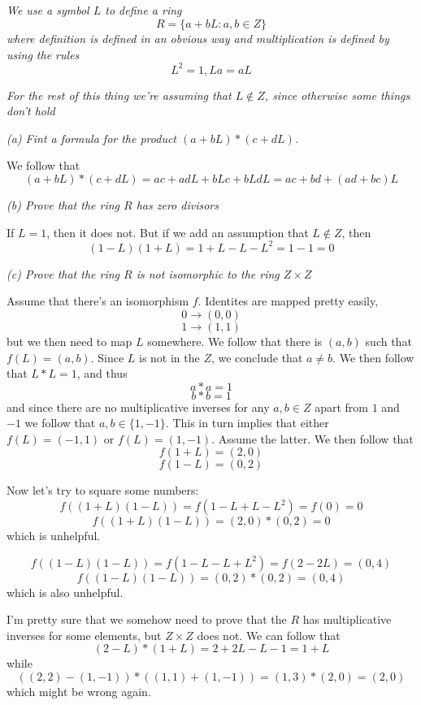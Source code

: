 \documentclass[11pt,oneside,titlepage]{book}
\newcommand{\set}[1]{\{ #1 \}}
\begin{document}
\subsection{}

\textit{We use a symbol $L$ to define a ring
  $$R = \set{a + bL: a, b \in Z}$$
  where definition is defined in an obvious way and multiplication is
defined by using the rules
  $$L^2 = 1, La = aL$$
}

\textit{For the rest of this thing we're assuming that $L \notin Z$,
since otherwise some things don't hold}

\textit{(a) Fint a formula for the product $(a + bL) * (c + dL)$.}

We follow that
$$(a + bL) * (c + dL) = ac + adL + bLc + bLdL = ac + bd + (ad + bc)L$$ 

\textit{(b) Prove that the ring $R$ has zero divisors}

If $L = 1$, then it does not. But if we add an assumption that $L
\notin Z$, then
$$(1 - L) (1 + L) = 1 + L - L - L^2 = 1 - 1 =  0$$

\textit{(c) Prove that the ring $R$ is not isomorphic to the ring $Z
\times Z$}

Assume that there's an isomorphism $f$. Identites are mapped pretty
easily,
$$0 \to (0, 0)$$
$$1 \to (1, 1)$$
but we then need to map $L$ somewhere. We follow that there is $(a,
b)$ such that $f(L) = (a, b)$. Since $L$ is not in the $Z$, we
conclude that $a \neq b$. We then follow that $L * L = 1$, and thus
$$a * a = 1$$
$$b * b = 1$$
and since there are no multiplicative inverses for any $a, b \in Z$
apart from $1$ and $-1$ we follow that $a, b \in \set{1, -1}$.  This
in turn implies that either $f(L) = (-1, 1)$ or $f(L) = (1, -1)$.
Assume the latter. We then follow that
$$f(1 + L) = (2, 0)$$
$$f(1 - L) = (0, 2)$$

Now let's try to square some numbers:
$$f((1 + L)(1 - L)) = f(1 - L + L - L^2) = f(0) = 0$$
$$f((1 + L)(1 - L)) = (2, 0) * (0, 2) = 0$$
which is unhelpful.

$$f((1 - L)(1 - L)) = f(1 - L - L + L^2) = f(2 - 2L) = (0, 4)$$
$$f((1 - L)(1 - L)) = (0, 2) * (0, 2) = (0, 4)$$
which is also unhelpful.

I'm pretty sure that we somehow need to prove that the $R$ has
multiplicative inverses for some elements, but $Z \times Z$ does not.
We can follow that
$$(2 - L) * (1 + L) = 2 + 2L - L - 1 = 1 + L$$
while
$$((2, 2) - (1, -1)) * ((1, 1) + (1, -1)) = (1, 3) * (2, 0) = (2, 0)$$
which might be wrong again.
\end{document}
